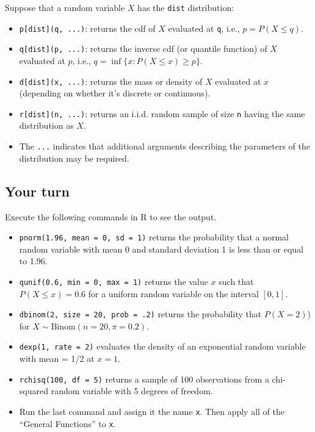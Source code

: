 \documentclass[
]{article}
\providecommand{\tightlist}{%
  \setlength{\itemsep}{0pt}\setlength{\parskip}{0pt}}
\begin{document}
Suppose that a random variable \(X\) has the \texttt{dist} distribution:

\begin{itemize}
\tightlist
\item
  \texttt{p{[}dist{]}(q,\ ...)}: returns the cdf of \(X\) evaluated at
  \texttt{q}, i.e., \(p=P(X\leq q)\).
\item
  \texttt{q{[}dist{]}(p,\ ...)}: returns the inverse cdf (or quantile
  function) of \(X\) evaluated at \(p\), i.e.,
  \(q = \inf\{x: P(X\leq x) \geq p\}\).
\item
  \texttt{d{[}dist{]}(x,\ ...)}: returns the mass or density of \(X\)
  evaluated at \(x\) (depending on whether it's discrete or continuous).
\item
  \texttt{r{[}dist{]}(n,\ ...)}: returns an i.i.d. random sample of size
  \texttt{n} having the same distribution as \(X\).
\item
  The \texttt{...} indicates that additional arguments describing the
  parameters of the distribution may be required.
\end{itemize}

\hypertarget{your-turn-9}{%
\subsection{Your turn}\label{your-turn-9}}

Execute the following commands in R to see the output.

\begin{itemize}
\tightlist
\item
  \texttt{pnorm(1.96,\ mean\ =\ 0,\ sd\ =\ 1)} returns the probability
  that a normal random variable with mean 0 and standard deviation 1 is
  less than or equal to 1.96.
\item
  \texttt{qunif(0.6,\ min\ =\ 0,\ max\ =\ 1)} returns the value \(x\)
  such that \(P(X\leq x) = 0.6\) for a uniform random variable on the
  interval \([0, 1]\).
\item
  \texttt{dbinom(2,\ size\ =\ 20,\ prob\ =\ .2)} returns the probability
  that \(P(X=2)\)) for \(X∼\textrm{Binom}(n=20,\pi=0.2)\).
\item
  \texttt{dexp(1,\ rate\ =\ 2)} evaluates the density of an exponential
  random variable with mean = 1/2 at \(x=1\).
\item
  \texttt{rchisq(100,\ df\ =\ 5)} returns a sample of 100 observations
  from a chi-squared random variable with 5 degrees of freedom.
\item
  Run the last command and assign it the name \texttt{x}. Then apply all
  of the ``General Functions'' to \texttt{x}.
\end{itemize}
\end{document}
